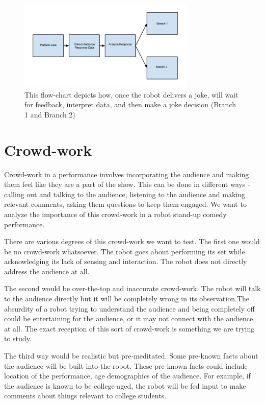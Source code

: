 \documentclass[onecolumn, draftclsnofoot,10pt, compsoc]{IEEEtran}
\begin{document}
\begin{figure}[H]
  \centering
  \includegraphics[width=0.75\textwidth,height=0.75\textheight,keepaspectratio]{fig1}
  \caption{ This flow-chart depicts how, once the robot delivers a joke, will wait for feedback, interpret data, and then make a joke decision (Branch 1 and Branch 2)}
\end{figure}

\section{Crowd-work}
Crowd-work in a performance involves incorporating the audience and making them feel like they are a part of the show. This can be done in different ways -  calling out and talking to the audience, listening to the audience and making relevant comments, asking them questions to keep them engaged. We want to analyze the importance of this crowd-work in a robot stand-up comedy performance.

There are various degrees of this crowd-work we want to test. The first one would be no crowd-work whatsoever. The robot goes about performing its set while acknowledging its lack of sensing and interaction. The robot does not directly address the audience at all.

The second would be over-the-top and inaccurate crowd-work. The robot will talk to the audience directly but it will be completely wrong in its observation.The absurdity of a robot trying to understand the audience and being completely off could be entertaining for the audience, or it may not connect with the audience at all. The exact reception of this sort of crowd-work is something we are trying to study.

The third way would be realistic but pre-meditated. Some pre-known facts about the audience will be built into the robot. These pre-known facts could include location of the performance, age demographics of the audience. For example, if the audience is known to be college-aged, the robot will be fed input to make comments about things relevant to college students.
\end{document}
